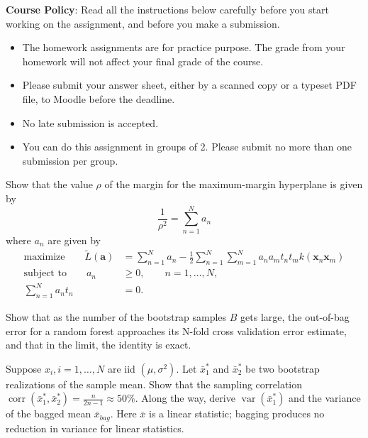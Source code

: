 \documentclass[a4 paper]{article}
\begin{document}
\textbf{Course Policy}: Read all the instructions below carefully before you start working on the assignment, and before you make a submission.
\begin{itemize}
    \item The homework assignments are for practice purpose. The grade from your homework will not affect your final grade of the course.
    \item Please submit your answer sheet, either by a scanned copy or a typeset PDF file, to Moodle before the deadline.
    \item No late submission is accepted.
    \item You can do this assignment in groups of 2. Please submit no more than one submission per group.
\end{itemize}

 Show that the value $\rho$ of the margin for the maximum-margin hyperplane is given by 
\begin{equation*}
    \frac{1}{\rho^2}=\sum_{n=1}^N a_n
\end{equation*}
where ${a_n}$ are given by\\ 
\begin{align*}
   \text{maximize} \qquad \widetilde{L}(\mathbf{a})&=\sum_{n=1}^N a_n-\frac{1}{2}\sum_{n=1}^N \sum_{m=1}^N a_na_mt_nt_mk(\mathbf{x}_n\mathbf{x}_m)\\
   \text{subject to} \qquad a_n&\geqslant0, \qquad n=1,\dots,N,\\
   \sum_{n=1}^N a_n t_n &= 0.
\end{align*}


\newpage

 Show that as the number of the bootstrap samples $B$ gets large, the out-of-bag error for a random forest approaches its N-fold cross validation error estimate, and that in the limit, the identity is exact.


 Suppose $x_{i}, i=1, \ldots, N$ are iid $\left(\mu, \sigma^{2}\right) .$ Let $\bar{x}_{1}^{*}$ and $\bar{x}_{2}^{*}$ be two bootstrap realizations of the sample mean. Show that the sampling correlation $\operatorname{corr}\left(\bar{x}_{1}^{*}, \bar{x}_{2}^{*}\right)=\frac{n}{2 n-1} \approx 50 \% .$ Along the way, derive $\operatorname{var}\left(\bar{x}_{1}^{*}\right)$ and the variance
of the bagged mean $\bar{x}_{b a g} .$ Here $\bar{x}$ is a linear statistic; bagging produces no reduction in variance for linear statistics.
\end{document}

